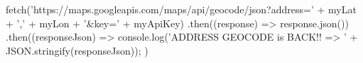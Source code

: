fetch('https://maps.googleapis.com/maps/api/geocode/json?address=' + myLat + ',' + myLon + '&key=' + myApiKey)
        .then((response) => response.json())
        .then((responseJson) => {
            console.log('ADDRESS GEOCODE is BACK!! => ' + JSON.stringify(responseJson));
})


